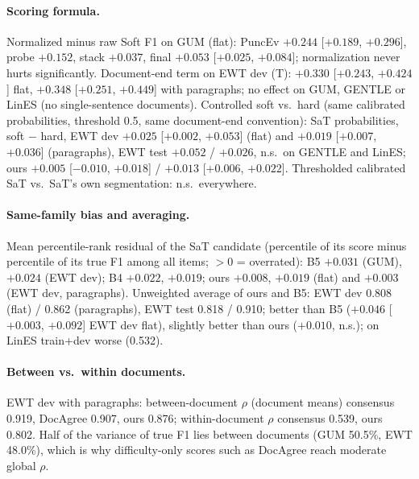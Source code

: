 \paragraph{Scoring formula.} Normalized minus raw Soft F1 on GUM (flat): PuncEv $+0.244$ [$+0.189$, $+0.296$], probe
$+0.152$, stack $+0.037$, final $+0.053$ [$+0.025$, $+0.084$]; normalization never hurts significantly. Document-end
term on EWT dev (T): $+0.330$ [$+0.243$, $+0.424$] flat, $+0.348$ [$+0.251$, $+0.449$] with paragraphs; no effect on
GUM, GENTLE or LinES (no single-sentence documents). Controlled soft vs.\ hard (same calibrated probabilities, threshold
0.5, same document-end convention): SaT probabilities, soft $-$ hard, EWT dev $+0.025$ [$+0.002$, $+0.053$] (flat) and
$+0.019$ [$+0.007$, $+0.036$] (paragraphs), EWT test $+0.052$ / $+0.026$, n.s.\ on GENTLE and LinES; ours $+0.005$
[$-0.010$, $+0.018$] / $+0.013$ [$+0.006$, $+0.022$]. Thresholded calibrated SaT vs.\ SaT's own segmentation: n.s.\
everywhere.

\paragraph{Same-family bias and averaging.} Mean percentile-rank residual of the SaT candidate (percentile of its score
minus percentile of its true F1 among all items; $> 0$ = overrated): B5 $+0.031$ (GUM), $+0.024$ (EWT dev); B4 $+0.022$, $+0.019$; ours $+0.008$, $+0.019$ (flat) and $+0.003$
(EWT dev, paragraphs). Unweighted average of ours and B5: EWT dev 0.808 (flat) / 0.862 (paragraphs), EWT test 0.818 /
0.910; better than B5 ($+0.046$ [$+0.003$, $+0.092$] EWT dev flat), slightly better than ours ($+0.010$, n.s.); on
LinES train+dev worse (0.532).

\paragraph{Between vs.\ within documents.} EWT dev with paragraphs: between-document $\rho$ (document means) consensus
0.919, DocAgree 0.907, ours 0.876; within-document $\rho$ consensus 0.539, ours 0.802. Half of the variance of true F1
lies between documents (GUM 50.5\%, EWT 48.0\%), which is why difficulty-only scores such as DocAgree reach moderate
global $\rho$.
